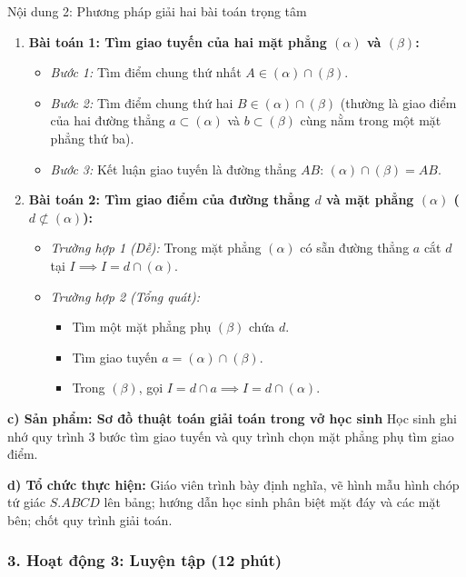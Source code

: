 \documentclass[12pt, a4paper]{article}
\begin{document}
\begin{pedabox}{Nội dung 2: Phương pháp giải hai bài toán trọng tâm}
\begin{enumerate}[leftmargin=0.6cm]
    \item \textbf{Bài toán 1: Tìm giao tuyến của hai mặt phẳng $(\alpha)$ và $(\beta)$:}
    \begin{itemize}
        \item \textit{Bước 1:} Tìm điểm chung thứ nhất $A \in (\alpha) \cap (\beta)$.
        \item \textit{Bước 2:} Tìm điểm chung thứ hai $B \in (\alpha) \cap (\beta)$ (thường là giao điểm của hai đường thẳng $a \subset (\alpha)$ và $b \subset (\beta)$ cùng nằm trong một mặt phẳng thứ ba).
        \item \textit{Bước 3:} Kết luận giao tuyến là đường thẳng $AB$: $(\alpha) \cap (\beta) = AB$.
    \end{itemize}

    \item \textbf{Bài toán 2: Tìm giao điểm của đường thẳng $d$ và mặt phẳng $(\alpha)$ ($d \not\subset (\alpha)$):}
    \begin{itemize}
        \item \textit{Trường hợp 1 (Dễ):} Trong mặt phẳng $(\alpha)$ có sẵn đường thẳng $a$ cắt $d$ tại $I \implies I = d \cap (\alpha)$.
        \item \textit{Trường hợp 2 (Tổng quát):}
        \begin{itemize}
            \item Tìm một mặt phẳng phụ $(\beta)$ chứa $d$.
            \item Tìm giao tuyến $a = (\alpha) \cap (\beta)$.
            \item Trong $(\beta)$, gọi $I = d \cap a \implies I = d \cap (\alpha)$.
        \end{itemize}
    \end{itemize}
\end{enumerate}
\end{pedabox}

\noindent \textbf{c) Sản phẩm: Sơ đồ thuật toán giải toán trong vở học sinh}
Học sinh ghi nhớ quy trình 3 bước tìm giao tuyến và quy trình chọn mặt phẳng phụ tìm giao điểm.

\noindent \textbf{d) Tổ chức thực hiện:}
Giáo viên trình bày định nghĩa, vẽ hình mẫu hình chóp tứ giác $S.ABCD$ lên bảng; hướng dẫn học sinh phân biệt mặt đáy và các mặt bên; chốt quy trình giải toán.

\subsubsection*{3. Hoạt động 3: Luyện tập (12 phút)}
\end{document}
